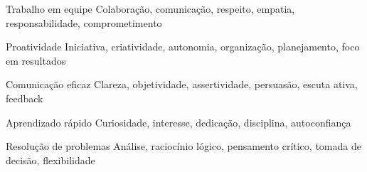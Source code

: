 
\begin{cvsoftkills}

  \cvsoftkill
    {Trabalho em equipe } %
    {Colaboração, comunicação, respeito, empatia, responsabilidade, comprometimento} %

  \cvsoftkill
    {Proatividade } %
    {Iniciativa, criatividade, autonomia, organização, planejamento, foco em resultados} %

  \cvsoftkill
    {Comunicação eficaz } %
    {Clareza, objetividade, assertividade, persuasão, escuta ativa, feedback} %

  \cvsoftkill
    {Aprendizado rápido } %
    {Curiosidade, interesse, dedicação, disciplina, autoconfiança} %

  \cvsoftkill
    {Resolução de problemas } %
    {Análise, raciocínio lógico, pensamento crítico, tomada de decisão, flexibilidade} %
    

\end{cvsoftkills}
